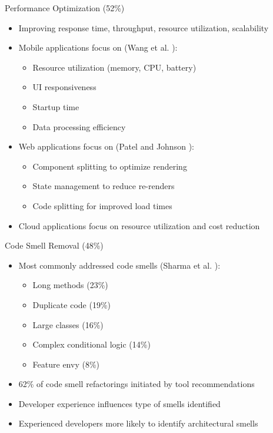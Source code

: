 \documentclass{beamer}
\begin{document}
\begin{frame}{Performance Optimization (52\%)}
    \begin{itemize}
        \item Improving response time, throughput, resource utilization, scalability
        \item Mobile applications focus on (Wang et al. \cite{wang2022}):
            \begin{itemize}
                \item Resource utilization (memory, CPU, battery)
                \item UI responsiveness
                \item Startup time
                \item Data processing efficiency
            \end{itemize}
        \item Web applications focus on (Patel and Johnson \cite{patel2024}):
            \begin{itemize}
                \item Component splitting to optimize rendering
                \item State management to reduce re-renders
                \item Code splitting for improved load times
            \end{itemize}
        \item Cloud applications focus on resource utilization and cost reduction
    \end{itemize}
\end{frame}

\begin{frame}{Code Smell Removal (48\%)}
    \begin{itemize}
        \item Most commonly addressed code smells (Sharma et al. \cite{sharma2023}):
            \begin{itemize}
                \item Long methods (23\%)
                \item Duplicate code (19\%)
                \item Large classes (16\%)
                \item Complex conditional logic (14\%)
                \item Feature envy (8\%)
            \end{itemize}
        \item 62\% of code smell refactorings initiated by tool recommendations
        \item Developer experience influences type of smells identified
        \item Experienced developers more likely to identify architectural smells
    \end{itemize}
\end{frame}
\end{document}
